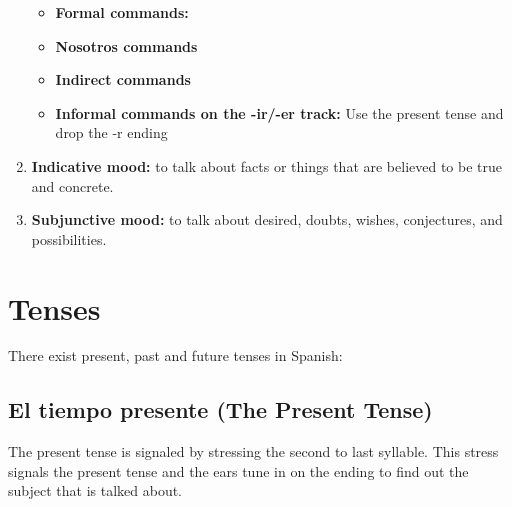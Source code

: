 \documentclass[a4paper,12pt]{article}
\begin{document}
\begin{enumerate}
\begin{itemize}
  \item \textbf{Formal commands:}
  \item \textbf{Nosotros commands}
  \item \textbf{Indirect commands}


\item \textbf{Informal commands on the -ir/-er track:} Use the present tense and drop the -r ending


  \end{itemize}


\item \textbf{Indicative mood:} to talk about facts or things that are believed to be true and
  concrete.
\item \textbf{Subjunctive mood:} to talk about desired, doubts, wishes, conjectures, and
  possibilities.

\end{enumerate}


\section{Tenses}

There exist present, past and future tenses in Spanish:

\subsection{El tiempo presente (The Present Tense)}

The present tense is signaled by stressing the second to last syllable. This stress signals the
present tense and the ears tune in on the ending to find out the subject that is talked about.
\end{document}
